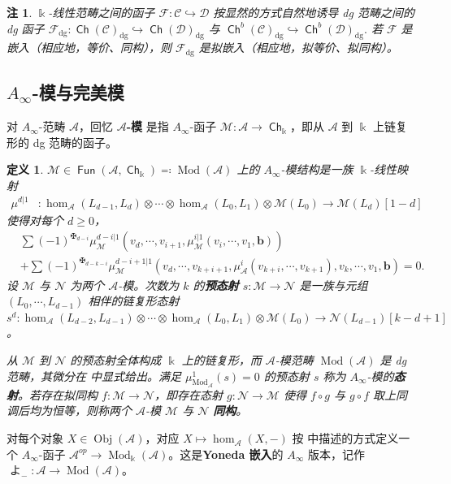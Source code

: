 \documentclass[11pt,a4paper]{article}
\renewcommand{\emph}[1]{{\bfseries #1}}
\DeclareMathOperator{\Fun}{\mathsf{Fun}}
\DeclareMathOperator{\Mod}{\mathrm{Mod}}
\DeclareMathOperator{\Ch}{\mathsf{Ch}}
\DeclareMathOperator{\Obj}{Obj}
\DeclareMathOperator{\field}{\mathbb{k}}
\DeclareMathOperator{\dg}{\operatorname{dg}}
\DeclareMathOperator{\yo}{\text{よ}}
\theoremstyle{cnth}
\newtheorem{dfn}[thm]{定义}
\newtheorem{rmk}[thm]{注}
\begin{document}
\begin{rmk}\label{rmk:EmbeddingOfCochainComplexes}
$\field$-线性范畴之间的函子 $\mathcal{F}:\mathcal{C}\hookrightarrow\mathcal{D}$ 按显然的方式自然地诱导 dg 范畴之间的 dg 函子
$
\mathcal{F}_{\dg}:
\Ch(\mathcal{C})_{\dg}
\hookrightarrow
\Ch(\mathcal{D})_{\dg}
$
与
$
\Ch^b(\mathcal{C})_{\dg}
\hookrightarrow
\Ch^b(\mathcal{D})_{\dg}.
$
若 $\mathcal{F}$ 是嵌入（相应地，等价、同构），则 $\mathcal{F}_{\dg}$ 是拟嵌入（相应地，拟等价、拟同构）。
\end{rmk}
\subsection[模与完美模]{$A_{\infty}$-模与完美模}
对 $A_{\infty}$-范畴 $\mathcal{A}$，回忆 \emph{$\mathcal{A}$-模} 是指 $A_{\infty}$-函子 $\mathcal{M}\colon\mathcal{A}\to\Ch_{\field}$，即从 $\mathcal{A}$ 到 $\field$ 上链复形的 dg 范畴的函子。
\begin{dfn}\label{dfn:A-inf-module}
     $\mathcal{M}\in\Fun (\mathcal{A},\Ch_{\field})\eqqcolon\Mod (\mathcal{A})$ 上的 $A_{\infty}$-模结构是一族 $\field$-线性映射
    \begin{align*}
    \mu^{d\vert 1}&\colon\hom_{\mathcal{A}} (L_{d-1},L_d)\otimes\dotsb\otimes\hom_{\mathcal{A}} (L_0, L_1)\otimes\mathcal{M} (L_0)\to\mathcal{M} (L_d) [1-d]
    \end{align*}
    使得对每个 $d\geq 0$，
\begin{equation}\label{eq:A-inf-bimodule-equation}\begin{aligned}
        &\sum (-1)^{\maltese_{d-i}}\mu_{\mathcal{M}}^{d-i\vert 1}(v_d,\dotsb,v_{i+1},\mu_{\mathcal{M}}^{i\vert 1} (v_i,\dotsb, v_1,\mathbf{b}))\\
        &+\sum (-1)^{\maltese_{d-k-i}}\mu_{\mathcal{M}}^{d-i+1\vert 1}(v_d,\dotsb, v_{k+i+1},\mu_{\mathcal{A}}^i (v_{k+i},\dotsb,v_{k+1}),v_k,\dotsb, v_1,\mathbf{b})=0.
    \end{aligned}\end{equation}
    设 $\mathcal{M}$ 与 $\mathcal{N}$ 为两个 $\mathcal{A}$-模。次数为 $k$ 的\emph{预态射} $s\colon\mathcal{M}\to\mathcal{N}$ 是一族与元组 $(L_0,\dotsb, L_{d-1})$ 相伴的链复形态射
    $s^d\colon\hom_{\mathcal A}(L_{d-2},L_{d-1})\otimes\dotsb\otimes\hom_{\mathcal A}(L_0,L_1)\otimes\mathcal M(L_0)\longrightarrow\mathcal N(L_{d-1})[k-d+1]$。

    从 $\mathcal{M}$ 到 $\mathcal{N}$ 的预态射全体构成 $\Bbbk$ 上的链复形，而 $\mathcal{A}$-模范畴 $\Mod (\mathcal{A})$ 是 dg 范畴，其微分在 \cite[page 20]{Seidel08} 中显式给出。满足 $\mu^1_{\Mod_{\mathcal{A}}} (s)=0$ 的预态射 $s$ 称为 $A_{\infty}$-模的\emph{态射}。若存在拟同构 $f\colon\mathcal{M}\to\mathcal{N}$，即存在态射 $g\colon\mathcal{N}\to\mathcal{M}$ 使得 $f\circ g$ 与 $g\circ f$ 取上同调后均为恒等，则称两个 $\mathcal{A}$-模 $\mathcal{M}$ 与 $\mathcal{N}$ \emph{同构}。
\end{dfn}
对每个对象 $X\in\Obj (\mathcal{A})$，对应 $X\mapsto\hom_{\mathcal{A}} (X,-)$ 按 \cite[section (1l)]{Seidel08} 中描述的方式定义一个 $A_{\infty}$-函子 $\mathcal{A}^{op}\to\Mod_{\field} (\mathcal{A})$。这是\emph{Yoneda 嵌入}的 $A_{\infty}$ 版本，记作 $\yo_{-}\colon\mathcal{A}\to\Mod (\mathcal{A})$。
\end{document}
